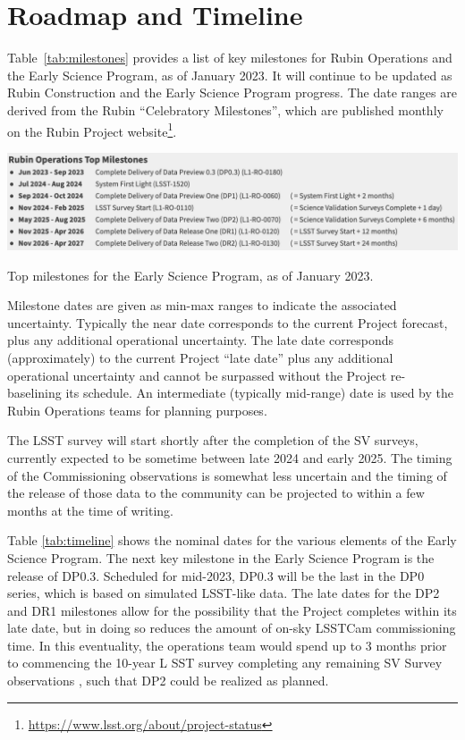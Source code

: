 \section{Roadmap and Timeline} \label{sec:timeline}

Table~\ref{tab:milestones} provides a list of key milestones for Rubin Operations and the Early Science Program, as of January 2023.
It will continue to be updated as Rubin Construction and the Early Science Program progress. 
The date ranges are derived from the Rubin ``Celebratory Milestones'', which are  published monthly on the Rubin Project website\footnote{\url{https://www.lsst.org/about/project-status}}. 

\begin{table}[htb]
\label{tab:milestones}
\includegraphics[width=\linewidth]{figures/DPR-milestones}
\caption{Top milestones for the Early Science Program, as of January 2023.}
\end{table}

Milestone dates are given as min-max ranges to indicate the associated uncertainty. 
Typically the near date corresponds to the current Project forecast, plus any additional operational uncertainty.
The late date corresponds (approximately) to the current Project ``late date'' plus any additional operational uncertainty and cannot be surpassed without the Project re-baselining its schedule.
An intermediate (typically mid-range) date is used by the Rubin Operations teams for planning purposes. 

The LSST survey will start shortly after the completion of the SV surveys, currently expected to be sometime between late 2024 and early 2025.
The timing of the Commissioning observations is somewhat less uncertain and the timing of the release of those data to the community can be projected to within a few months at the time of writing.

Table \ref{tab:timeline} shows the nominal  dates for the various elements of the Early Science Program. 
The next key milestone in the Early Science Program is the release of DP0.3. 
Scheduled for mid-2023, DP0.3 will be the last in the DP0 series, which is based on simulated LSST-like data. 
The late dates for the DP2 and DR1 milestones allow for the possibility that the Project completes within its late date, but in doing so reduces the amount of on-sky LSSTCam commissioning time.
In this eventuality, the operations team would spend up to 3 months prior to commencing the 10-year L SST survey completing any remaining SV Survey observations , such that DP2 could be realized as planned.

